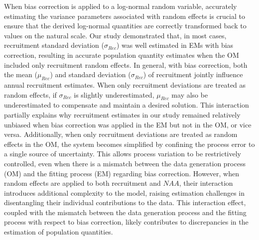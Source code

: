 \documentclass[
  12pt,
]{article}
\begin{document}
When bias correction is applied to a log-normal random variable,
accurately estimating the variance parameters associated with random
effects is crucial to ensure that the derived log-normal quantities are
correctly transformed back to values on the natural scale. Our study
demonstrated that, in most cases, recruitment standard deviation
(\(\sigma_{Rec}\)) was well estimated in EMs with bias correction,
resulting in accurate population quantity estimates when the OM included
only recruitment random effects. In general, with bias correction, both
the mean (\(\mu_{Rec}\)) and standard deviation (\(\sigma_{Rec}\)) of
recruitment jointly influence annual recruitment estimates. When only
recruitment deviations are treated as random effects, if
\(\sigma_{Rec}\) is slightly underestimated, \(\mu_{Rec}\) may also be
underestimated to compensate and maintain a desired solution. This
interaction partially explains why recruitment estimates in our study
remained relatively unbiased when bias correction was applied in the EM
but not in the OM, or vice versa. Additionally, when only recruitment
deviations are treated as random effects in the OM, the system becomes
simplified by confining the process error to a single source of
uncertainty. This allows process variation to be restrictively
controlled, even when there is a mismatch between the data generation
process (OM) and the fitting process (EM) regarding bias correction.
However, when random effects are applied to both recruitment and
\(NAA\), their interaction introduces additional complexity to the
model, raising estimation challenges in disentangling their individual
contributions to the data. This interaction effect, coupled with the
mismatch between the data generation process and the fitting process
with respect to bias correction, likely contributes to discrepancies in
the estimation of population quantities.
\end{document}

